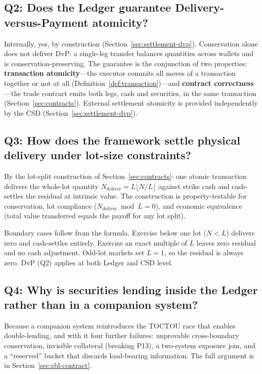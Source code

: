 \documentclass[11pt,a4paper]{article}
\begin{document}
\subsection*{Q2: Does the Ledger guarantee Delivery-versus-Payment atomicity?}

Internally, yes, by construction (Section~\ref{sec:settlement-dvp}). Conservation alone does not deliver DvP: a single-leg transfer balances quantities across wallets and is conservation-preserving. The guarantee is the conjunction of two properties: \textbf{transaction atomicity}---the executor commits all moves of a transaction together or not at all (Definition~\ref{def:transaction})---and \textbf{contract correctness}---the trade contract emits both legs, cash and securities, in the same transaction (Section~\ref{sec:contracts}). External settlement atomicity is provided independently by the CSD (Section~\ref{sec:settlement-dvp}).

\subsection*{Q3: How does the framework settle physical delivery under lot-size constraints?}

By the lot-split construction of Section~\ref{sec:contracts}: one atomic transaction delivers the whole-lot quantity $N_{\text{deliver}} = L\lfloor N/L\rfloor$ against strike cash and cash-settles the residual at intrinsic value. The construction is property-testable for conservation, lot compliance ($N_{\text{deliver}} \bmod L = 0$), and economic equivalence (total value transferred equals the payoff for any lot split).

Boundary cases follow from the formula. Exercise below one lot ($N<L$) delivers zero and cash-settles entirely. Exercise an exact multiple of $L$ leaves zero residual and no cash adjustment. Odd-lot markets set $L=1$, so the residual is always zero. DvP (Q2) applies at both Ledger and CSD level.

\subsection*{Q4: Why is securities lending inside the Ledger rather than in a companion system?}

Because a companion system reintroduces the TOCTOU race that enables double-lending, and with it four further failures: unprovable cross-boundary conservation, invisible collateral (breaking P13), a two-system exposure join, and a ``reserved'' bucket that discards load-bearing information. The full argument is in Section~\ref{sec:sbl-contract}.
\end{document}
